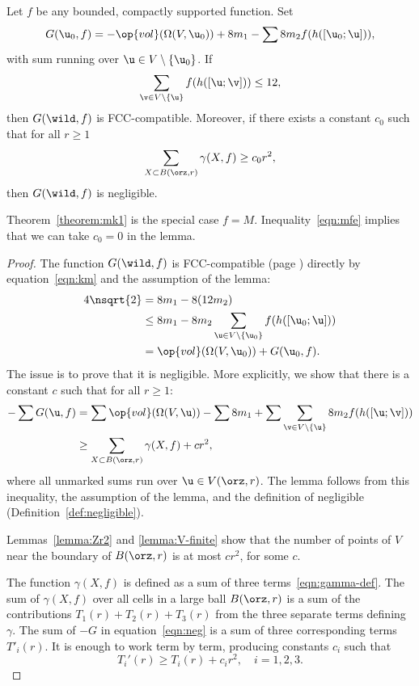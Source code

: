 \begin{lemma}\label{lemma:mk1}
  Let $f$ be any bounded, compactly supported function.  Set
\[
G( \u_0,f) = -\op{vol}(\Omega(V, \u_0)) + 8
m_1 - \sum 8 m_2 f(h([\u_0;\u])),
\]
with sum running over $\u\in V\setminus\{\u_0\}$.
If
\[  
\sum_{\v\in V\setminus\{\u\}} f(h([\u;\v])) \le 12,
\] 
then $G(\wild,f)$ is FCC-compatible.
Moreover, if there exists a constant $c_0$ such
that for all  $r\ge1$
\[
\sum_{X\subset B(\orz,r)} \gamma(X,f) \ge c_0 r^2,
\]
then $G(\wild,f)$ is negligible.
\end{lemma}

Theorem~\ref{theorem:mk1} is the special case $f=M$.  
Inequality~\ref{eqn:mfe} implies that we can take $c_0=0$ in the
lemma.

\begin{proof} 
%
The function $G(\wild,f)$ is FCC-compatible (page \pageref{def:negligible}) directly
by equation~\eqref{eqn:km}
and the assumption of the lemma:
%
%
\begin{align*} 
4\nsqrt{2} &= 8 m_1 - 8 (12 m_2)\\
&\le 8 m_1 - 8 m_2 \sum_{\u\in V\setminus \{\u_0\} } f(h([\u_0;\u]))\\
&= \op{vol}(\Omega(V, \u_0)) + G( \u_0,f).
\end{align*}
The issue is to prove that it is negligible. 
More explicitly, we show that there is a
constant $c$ such that for all $r\ge 1$:%
\begin{align}\label{eqn:neg} 
-\sum G( \u,f) &= 
\sum \op{vol}(\Omega(V, \u)) 
-\sum 8m_1 + 
\sum \sum_{\v\in V\setminus\{\u\} } 8 m_2 f(h([\u;\v]))\notag \\
&\ge \sum_{X\subset B(\orz,r)} \gamma(X,f)  + c r^2,
\end{align}
where all unmarked sums run over $ \u\in  V(\orz,r)$.  
The lemma follows from this inequality, the assumption of the lemma,
 and the definition of negligible (Definition~\ref{def:negligible}).

Lemmas~\ref{lemma:Zr2} and \ref{lemma:V-finite} show that the number
of points of $ V$ near the boundary of $B(\orz,r)$ is at most $c r^2$,
for some $c$.


The function $\gamma(X,f)$ is defined as a sum of three
terms~\eqref{eqn:gamma-def}.  The sum of $\gamma(X,f)$
over all cells in a large ball
$B(\orz,r)$ is a sum of the contributions $T_1(r) + T_2(r) + T_3(r)$ from
the three separate terms defining $\gamma$.  
The sum of $-G$ in  equation~\eqref{eqn:neg} is a sum of three
corresponding terms $T'_i(r)$.  It is enough to work term by term, producing
constants $c_i$ such that
\[  
T_i'(r) \ge T_i(r) + c_i r^2,\quad i=1,2,3.
\] 


\end{proof}
